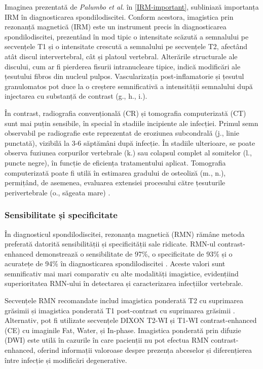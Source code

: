 \documentclass[romanian,12pt,a4paper]{article}
\begin{document}
Imaginea prezentată de \emph{Palumbo et al.} în
\ref{IRM-important}{}, subliniază importanța IRM în
diagnosticarea spondilodiscitei. Conform acestora, imagistica prin
rezonanță magnetică (IRM) este un instrument precis în diagnosticarea
spondilodiscitei, prezentând în mod tipic o intensitate scăzută a
semnalului pe secvențele T1 și o intensitate crescută a semnalului pe
secvențele T2, afectând atât discul intervertebral, cât și platoul
vertebral. Alterările structurale ale discului, cum ar fi pierderea
fisurii intranucleare tipice, indică modificări ale țesutului fibros din
nucleul pulpos. Vascularizația post-inflamatorie și țesutul granulomatos
pot duce la o creștere semnificativă a intensității semnalului după
injectarea cu substanță de contrast (g., h., i.).

În contrast, radiografia convențională (CR) și tomografia computerizată
(CT) sunt mai puțin sensibile, în special în stadiile incipiente ale
infecției. Primul semn observabil pe radiografie este reprezentat de
eroziunea subcondrală (j., linie punctată), vizibilă la 3-6 săptămâni
după infecție. În stadiile ulterioare, se poate observa fuziunea
corpurilor vertebrale (k.) sau colapsul complet al somitelor (l., puncte
negre), în funcție de eficiența tratamentului aplicat. Tomografia
computerizată poate fi utilă în estimarea gradului de osteoliză (m.,
n.), permițând, de asemenea, evaluarea extensiei procesului către
țesuturile perivertebrale (o., săgeata mare)
\cite{DiagnosticInterventionalManagement2020}.

\subsubsection{Sensibilitate și specificitate}

În diagnosticul spondilodiscitei, rezonanța magnetică (RMN) rămâne
metoda preferată datorită sensibilității și specificității sale
ridicate. RMN-ul contrast-enhanced demonstrează o sensibilitate de 97\%,
o specificitate de 93\% și o acuratețe de 94\% în diagnosticarea
spondilodiscitei \cite{ComparisonDiagnosticValue2017}. Aceste valori sunt
semnificativ mai mari comparativ cu alte modalități imagistice,
evidențiind superioritatea RMN-ului în detectarea și caracterizarea
infecțiilor vertebrale.

Secvențele RMN recomandate includ imagistica ponderată T2 cu suprimarea
grăsimii și imagistica ponderată T1 post-contrast cu suprimarea grăsimii
\cite{ComparisonDiagnosticValue2017}. Alternativ, pot fi utilizate
secvențele DIXON T2-WI și T1-WI contrast-enhanced (CE) cu imaginile Fat,
Water, și In-phase. Imagistica ponderată prin difuzie (DWI) este utilă
în cazurile în care pacienții nu pot efectua RMN contrast-enhanced,
oferind informații valoroase despre prezența abceselor și diferențierea
între infecție și modificări degenerative.
\end{document}
